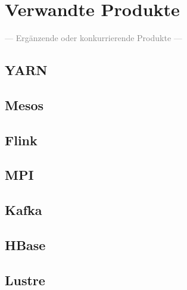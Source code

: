 \section{Verwandte Produkte}
\textcolor{gray}{--- Ergänzende oder konkurrierende Produkte ---}\\
\subsection{YARN}
\subsection{Mesos}
\subsection{Flink}
\subsection{MPI}
\subsection{Kafka}
\subsection{HBase}
\subsection{Lustre}
